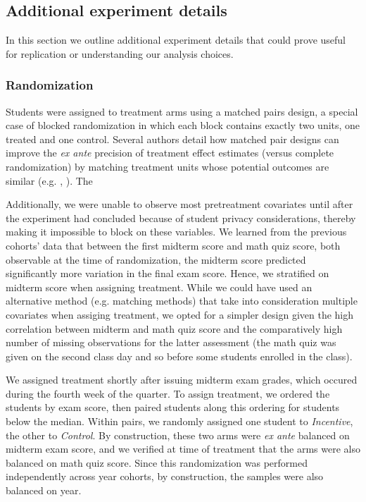 \documentclass[12pt]{article}
\begin{document}
\setcounter{table}{0}
\renewcommand{\thetable}{A\arabic{table}}

\subsection{Additional experiment details}

In this section we outline additional experiment details that could prove useful for replication or understanding our analysis choices.

\subsubsection{Randomization} \label{a_randomization}
Students were assigned to treatment arms using a matched pairs design, a special case of blocked randomization in which each block contains exactly two units, one treated and one control. Several authors detail how matched pair designs can improve the \textit{ex ante} precision of treatment effect estimates (versus complete randomization) by matching treatment units whose potential outcomes are similar (e.g. \cite{ir2015}, \cite{ai2017}). The

Additionally, we were unable to observe most pretreatment covariates until after the experiment had concluded because of student privacy considerations, thereby making it impossible to block on these variables. We learned from the previous cohorts' data that between the first midterm score and math quiz score, both observable at the time of randomization, the midterm score predicted significantly more variation in the final exam score. Hence, we stratified on midterm score when assigning treatment. While we could have used an alternative method (e.g. matching methods) that take into consideration multiple covariates when assiging treatment, we opted for a simpler design given the high correlation between midterm and math quiz score and the comparatively high number of missing observations for the latter assessment (the math quiz was given on the second class day and so before some students enrolled in the class).

We assigned treatment shortly after issuing midterm exam grades, which occured during the fourth week of the quarter. To assign treatment, we ordered the students by exam score, then paired students along this ordering for students below the median. Within pairs, we randomly assigned one student to \textit{Incentive}, the other to \textit{Control}. By construction, these two arms were \textit{ex ante} balanced on midterm exam score, and we verified at time of treatment that the arms were also balanced on math quiz score. Since this randomization was performed independently across year cohorts, by construction, the samples were also balanced on year.
\end{document}

